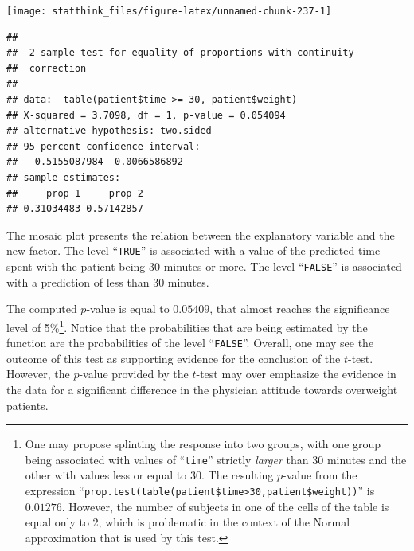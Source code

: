 \documentclass[]{krantz}
\makeatletter
\newenvironment{Shaded}{\begin{snugshade}}{\end{snugshade}}
\newcommand{\DecValTok}[1]{\textcolor[rgb]{0.00,0.00,0.81}{#1}}
\newcommand{\KeywordTok}[1]{\textcolor[rgb]{0.13,0.29,0.53}{\textbf{#1}}}
\newcommand{\NormalTok}[1]{#1}
\newcommand{\OperatorTok}[1]{\textcolor[rgb]{0.81,0.36,0.00}{\textbf{#1}}}
\newenvironment{kframe}{%
\medskip{}
\setlength{\fboxsep}{.8em}
 \def\at@end@of@kframe{}%
 \ifinner\ifhmode%
  \def\at@end@of@kframe{\end{minipage}}%
  \begin{minipage}{\columnwidth}%
 \fi\fi%
 \def\FrameCommand##1{\hskip\@totalleftmargin \hskip-\fboxsep
 \colorbox{shadecolor}{##1}\hskip-\fboxsep
     \hskip-\linewidth \hskip-\@totalleftmargin \hskip\columnwidth}%
 \MakeFramed {\advance\hsize-\width
   \@totalleftmargin\z@ \linewidth\hsize
   \@setminipage}}%
 {\par\unskip\endMakeFramed%
 \at@end@of@kframe}
\renewenvironment{Shaded}{\begin{kframe}}{\end{kframe}}
\theoremstyle{definition}
\theoremstyle{definition}
\theoremstyle{definition}
\theoremstyle{remark}
\makeatother
\begin{document}
\begin{center}\texttt{[image: statthink\_files/figure-latex/unnamed-chunk-237-1]} \end{center}

\begin{Shaded}
\end{Shaded}

\begin{verbatim}
## 
##  2-sample test for equality of proportions with continuity
##  correction
## 
## data:  table(patient$time >= 30, patient$weight)
## X-squared = 3.7098, df = 1, p-value = 0.054094
## alternative hypothesis: two.sided
## 95 percent confidence interval:
##  -0.5155087984 -0.0066586892
## sample estimates:
##     prop 1     prop 2 
## 0.31034483 0.57142857
\end{verbatim}

The mosaic plot presents the relation between the explanatory
variable and the new factor.
The level ``\texttt{TRUE}'' is associated with a value of the predicted time
spent with the patient being 30 minutes or more. The level ``\texttt{FALSE}'' is
associated with a prediction of less than 30 minutes.

The computed \(p\)-value is equal to \(0.05409\), that almost reaches the
significance level of 5\%\footnote{One may propose splinting the response into two groups, with one
  group being associated with values of ``\texttt{time}'' strictly \emph{larger}
  than 30 minutes and the other with values less or equal to 30. The
  resulting \(p\)-value from the expression
  ``\texttt{prop.test(table(patient\$time\textgreater{}30,patient\$weight))}'' is \(0.01276\).
  However, the number of subjects in one of the cells of the table is
  equal only to 2, which is problematic in the context of the Normal
  approximation that is used by this test.}. Notice that the probabilities that are
being estimated by the function are the probabilities of the level
``\texttt{FALSE}''. Overall, one may see the outcome of this test as supporting
evidence for the conclusion of the \(t\)-test. However, the \(p\)-value
provided by the \(t\)-test may over emphasize the evidence in the data for
a significant difference in the physician attitude towards overweight
patients.
\end{document}
